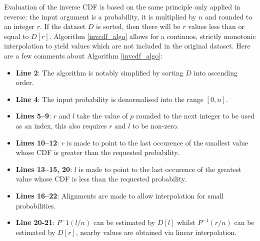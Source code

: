 \documentclass[10pt,final]{siamltex}
\begin{document}
Evaluation of the inverse CDF is based on the same principle only applied in reverse: the input argument is a probability, it is multiplied by $n$ and rounded to an integer $r$. If the dataset $D$ is sorted, then there will be $r$ values less than or equal to $D[r]$. Algorithm \ref{invcdf_algo} allows for a continuos, strictly monotonic interpolation to yield values which are not included in the original dataset.
Here are a few comments about Algorithm \ref{invcdf_algo}:
\begin{itemize}
  \item \textbf{Line 2}: The algorithm is notably simplified by sorting $D$ into ascending order.
  \item \textbf{Line 4}: The input probability is denormalised into the range $[0, n]$.
  \item \textbf{Lines 5--9}: $r$ and $l$ take the value of $p$ rounded to the next integer to be used as an index, this also requires $r$ and $l$ to be non-zero.
  \item \textbf{Lines 10--12}: $r$ is made to point to the last occurence of the smallest value whose CDF is greater than the requested probability.
  \item \textbf{Lines 13--15, 20}: $l$ is made to point to the last occurence of the greatest value whose CDF is less than the requested probability.
  \item \textbf{Lines 16--22}: Alignments are made to allow interpolation for small probabilities.
  \item \textbf{Line 20-21}: $P^-1(l/n)$ can be estimated by $D[l]$ whilst $P^{-1}(r/n)$ can be estimated by $D[r]$, nearby values are obtained via linear interpolation.
\end{itemize}
%
\end{document}
